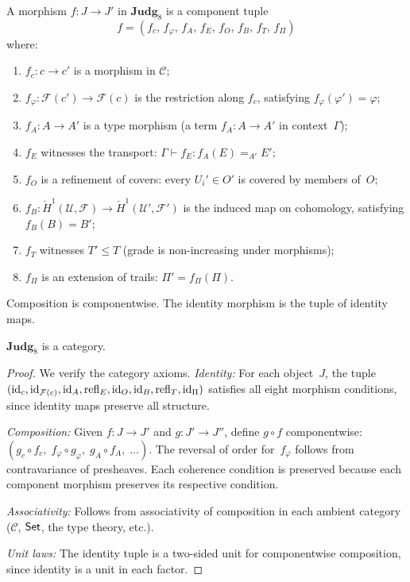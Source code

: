 \begin{definition}
\label{def:judg8-mor}
A morphism $f : J \to J'$ in $\mathbf{Judg}_8$ is a component tuple
\[
  f = (f_c,\, f_\varphi,\, f_A,\, f_E,\, f_O,\, f_B,\, f_T,\, f_\Pi)
\]
where:
\begin{enumerate}[label=(\roman*),nosep]
\item $f_c : c \to c'$ is a morphism in $\mathcal{C}$;
\item $f_\varphi : \mathcal{F}(c') \to \mathcal{F}(c)$ is the
  restriction along $f_c$, satisfying $f_\varphi(\varphi') = \varphi$;
\item $f_A : A \to A'$ is a type morphism (a term $f_A : A \to A'$
  in context~$\Gamma$);
\item $f_E$ witnesses the transport:
  $\Gamma \vdash f_E : f_A(E) =_{A'} E'$;
\item $f_O$ is a refinement of covers: every $U_i' \in O'$ is covered by
  members of~$O$;
\item $f_B : \check{H}^1(\mathcal{U},\mathcal{F}) \to
  \check{H}^1(\mathcal{U}',\mathcal{F}')$ is the induced map on
  cohomology, satisfying $f_B(B) = B'$;
\item $f_T$ witnesses $T' \leq T$ (grade is non-increasing under morphisms);
\item $f_\Pi$ is an extension of trails: $\Pi' = f_\Pi(\Pi)$.
\end{enumerate}
Composition is componentwise. The identity morphism is the tuple of
identity maps.
\end{definition}

\begin{lemma}
\label{lem:judg8-cat}
$\mathbf{Judg}_8$ is a category.
\end{lemma}

\begin{proof}
We verify the category axioms.
\emph{Identity:} For each object~$J$, the tuple
$(\mathrm{id}_c, \mathrm{id}_{\mathcal{F}(c)}, \mathrm{id}_A, \mathrm{refl}_E, \mathrm{id}_O, \mathrm{id}_B, \mathrm{refl}_T, \mathrm{id}_\Pi)$
satisfies all eight morphism conditions, since identity maps preserve
all structure.

\emph{Composition:} Given $f : J \to J'$ and $g : J' \to J''$, define
$g \circ f$ componentwise:
$(g_c \circ f_c,\; f_\varphi \circ g_\varphi,\; g_A \circ f_A,\;
\ldots)$.
The reversal of order for~$f_\varphi$ follows from contravariance of
presheaves.  Each coherence condition is preserved because each
component morphism preserves its respective condition.

\emph{Associativity:} Follows from associativity of composition in each
ambient category ($\mathcal{C}$, $\mathsf{Set}$, the type theory, etc.).

\emph{Unit laws:} The identity tuple is a two-sided unit for
componentwise composition, since identity is a unit in each factor.
\end{proof}

